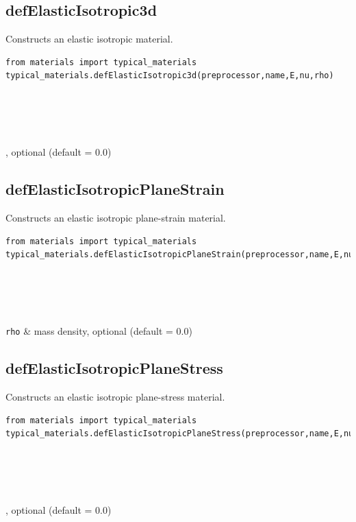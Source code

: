 \subsection{defElasticIsotropic3d}
\noindent Constructs an elastic isotropic material.
\begin{verbatim}
from materials import typical_materials
typical_materials.defElasticIsotropic3d(preprocessor,name,E,nu,rho)
\end{verbatim}
\begin{paramFuncTable}
\preprocessor{} \\
\\
\E{} \\
\nuX{} \\
\rhoX{}, optional (default = 0.0)\\
\end{paramFuncTable}


\subsection{defElasticIsotropicPlaneStrain}
\noindent Constructs an elastic isotropic plane-strain material.
\begin{verbatim}
from materials import typical_materials
typical_materials.defElasticIsotropicPlaneStrain(preprocessor,name,E,nu,rho)
\end{verbatim}
\begin{paramFuncTable}\preprocessor{} \\
\\
\E{} \\
\nuX \\
{\tt rho} &  mass density, optional (default = 0.0)\\
\end{paramFuncTable}


\subsection{defElasticIsotropicPlaneStress}
\noindent Constructs an elastic isotropic plane-stress material.
\begin{verbatim}
from materials import typical_materials
typical_materials.defElasticIsotropicPlaneStress(preprocessor,name,E,nu,rho)
\end{verbatim}
\begin{paramFuncTable}
\preprocessor{} \\
\\
\E{} \\
\nuX{} \\
\rhoX{} , optional (default = 0.0)\\
\end{paramFuncTable}


